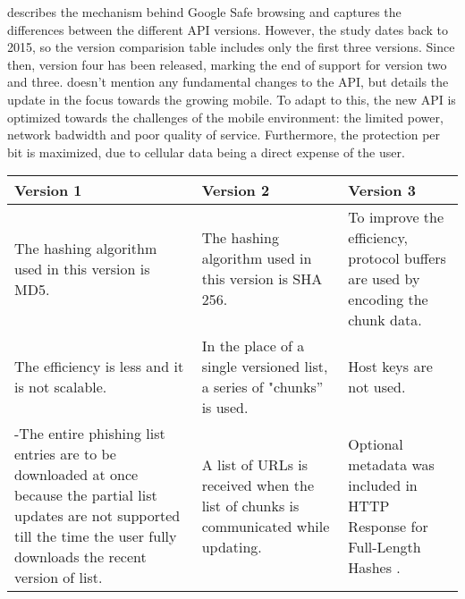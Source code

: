 \cite{GOOGLE_SAFE_BROWSING_VERSIONS} describes the mechanism behind Google Safe browsing and captures the differences between the different API versions. However, the study dates back to 2015, so the version comparision table includes only the first three versions. Since then, version four has been released, marking the end of support for version two and three.
\cite{GOOGLE_SAFE_BROWSING_V4} doesn't mention any fundamental changes to the API, but details the update in the focus towards the growing mobile. To adapt to this, the new API is optimized towards the challenges of the mobile environment: the limited power, network badwidth and poor quality of service. Furthermore, the protection per bit is maximized, due to cellular data being a direct expense of the user.

\begin{singlespace}
	\small
	\begin{center}
		\label{tab:OPTIMISED_MODELS}
		\begin{tabular}{ | m{13em} | m{12.9em} | m{13em} | }
			\hline
			\textbf{Version 1}                     &
			\textbf{Version 2}                     &
			\textbf{Version 3}                                                                                                                     \\
			\hline
			The hashing algorithm used in this
			version is MD5.                        & The hashing algorithm used in this
			version is SHA 256.                    & To improve the efficiency, protocol buffers are
			used by encoding the chunk data.                                                                                                       \\
			\hline
			The efficiency is less and it is not
			scalable.                              & In the place of a single versioned
			list, a series of "chunks” is used.    & Host keys are not used.                                                                       \\
			\hline
			-The entire phishing list entries are to be
			downloaded at once because the
			partial list updates are not supported
			till the time the user fully downloads
			the recent version of list.            & A list of URLs is received when the
			list of chunks is communicated
			while updating.                        & Optional metadata was included in HTTP
			Response for Full-Length Hashes .                                                                                                      \\

\end{tabular}
\end{center}
\end{singlespace}
